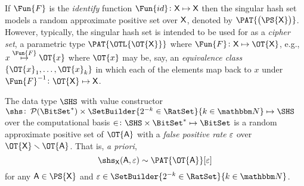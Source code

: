 \documentclass[ ../main.tex]{subfiles}
\begin{document}
If $\Fun{F}$ is the \emph{identify} function $\Fun{id} \colon \Set{X} \mapsto \Set{X}$ then the singular hash set models a random approximate positive set over $\Set{X}$, denoted by $\PAT{\left(\PS{\Set{X}}\right)}$.
However, typically, the singular hash set is intended to be used for as a \emph{cipher set}, a parametric type $\PAT{\OTL{\OT{\Set{X}}}}$ where $\Fun{F} \colon \Set{X} \mapsto \OT{\Set{X}}$, e.g., $x \overset{\Fun{F}}{\mapsto} \OT{x}$ where $\OT{x}$ may be, say, an \emph{equivalence class} $\{\OT{x}_1,\ldots,\OT{x}_k\}$ in which each of the elements map back to $x$ under $\Fun{F}^{-1} \colon \OT{\Set{X}} \mapsto \Set{X}$.

\begin{theorem}
The data type $\SHS$ with value constructor $\shs \colon \PowerSet(\BitSet^*) \times \SetBuilder{2^{-k} \in \RatSet}{k \in \NatSet} \mapsto \SHS$ over the computational basis $\SetContains \colon \SHS \times \BitSet^* \mapsto \BitSet$ is a random approximate positive set of $\OT{\Set{A}}$ with a \emph{false positive rate} $\varepsilon$ over $\OT{\Set{X}} \SetDiff \OT{\Set{A}}$.
That is, \emph{a priori},
\begin{equation}
	\shs_{\Set{X}}(\Set{A},\fprate) \sim \PAT{\OT{\Set{A}}}[\fprate]
\end{equation}
for any $\Set{A} \in \PS{\Set{X}}$ and $\fprate \in \SetBuilder{2^{-k} \in \RatSet}{k \in \NatSet}$.
\end{theorem}
\end{document}
